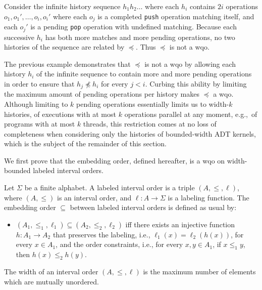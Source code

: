 \begin{example}

  Consider the infinite history sequence $h_1 h_2 \ldots$ where each $h_i$
  contains $2i$ operations $o_1, o_1', \ldots, o_i, o_i'$ where each $o_j$ is a
  completed {\tt push} operation matching itself, and each $o_j'$ is a pending
  {\tt pop} operation with undefined matching. Because each successive $h_i$
  has both more matches and more pending operations, no two histories of the
  sequence are related by $\preceq$. Thus $\preceq$ is not a wqo.

\end{example}

The previous example demonstrates that $\preceq$ is not a wqo by allowing each
history $h_i$ of the infinite sequence to contain more and more pending
operations in order to ensure that $h_j \not\preceq h_i$ for every $j < i$.
Curbing this ability by limiting the maximum amount of pending operations per
history makes $\preceq$ a wqo. Although limiting to $k$ pending operations
essentially limits us to width-$k$ histories, of executions with at most $k$
operations parallel at any moment, e.g.,~of programs with at most $k$ threads,
this restriction comes at no loss of completeness when considering only the
histories of bounded-width ADT kernels, which is the subject of the remainder
of this section.

We first prove that the embedding order, defined hereafter, is a wqo on width-bounded
labeled interval orders.

Let $\Sigma$ be a finite alphabet. A labeled interval order is a triple $(A,\leq,\ell)$, where $(A,\leq)$ is an interval 
order, and $\ell:A\rightarrow \Sigma$ is a labeling function. The embedding order $\subseteq$ between labeled interval orders is defined as
usual by:
\begin{itemize}
	\item $(A_1,\leq_1,\ell_1)\subseteq (A_2,\leq_2,\ell_2)$ iff there exists an injective function $h:A_1\rightarrow A_2$ that 
	preserves the labeling, i.e., $\ell_1(x)=\ell_2(h(x))$, for every $x\in A_1$, and the order constraints, i.e.,
	for every $x,y\in A_1$, if $x \leq_1 y$, then $h(x)\leq_2 h(y)$.
\end{itemize}

The width of an interval order $(A,\leq,\ell)$ is the maximum number of elements which are mutually unordered.

